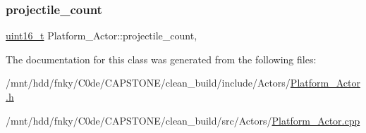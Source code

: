 \subsubsection{\texorpdfstring{projectile\+\_\+count}{projectile\_count}}
{\footnotesize\ttfamily \hyperlink{stdint_8h_a273cf69d639a59973b6019625df33e30}{uint16\+\_\+t} Platform\+\_\+\+Actor\+::projectile\+\_\+count\hspace{0.3cm}{\ttfamily [static]}, {\ttfamily [private]}}



The documentation for this class was generated from the following files\+:\begin{DoxyCompactItemize}
\item 
/mnt/hdd/fnky/\+C0de/\+C\+A\+P\+S\+T\+O\+N\+E/clean\+\_\+build/include/\+Actors/\hyperlink{Platform__Actor_8h}{Platform\+\_\+\+Actor.\+h}\item 
/mnt/hdd/fnky/\+C0de/\+C\+A\+P\+S\+T\+O\+N\+E/clean\+\_\+build/src/\+Actors/\hyperlink{Platform__Actor_8cpp}{Platform\+\_\+\+Actor.\+cpp}\end{DoxyCompactItemize}
